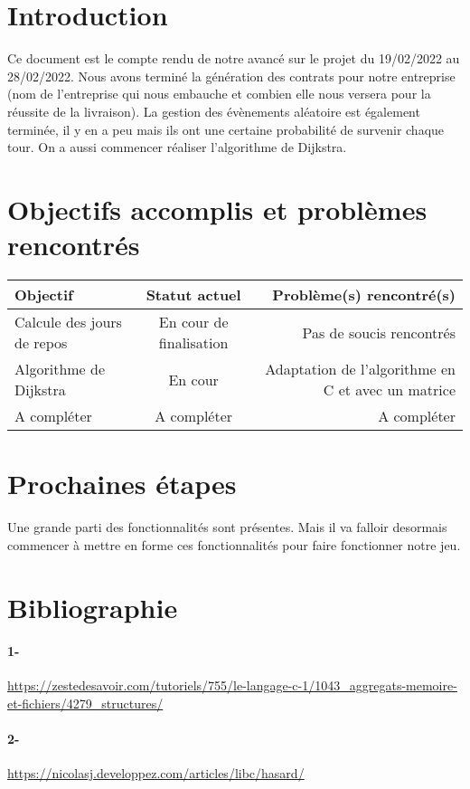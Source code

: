 \documentclass[a4paper, 12pt]{article}
\begin{document}
\newpage



\section*{Introduction}
      Ce document est le compte rendu de notre avancé sur le projet du 19/02/2022 au 28/02/2022. Nous avons terminé la génération des contrats pour notre entreprise (nom de l'entreprise qui nous embauche et combien elle nous versera pour la réussite de la livraison). La gestion des évènements aléatoire est également terminée, il y en a peu mais ils ont une certaine probabilité de survenir chaque tour. On a aussi commencer  réaliser l'algorithme de Dijkstra. 

\section{Objectifs accomplis et problèmes rencontrés}
     \begin{tabular}{|l|c|r|}
  \hline
  Objectif & Statut actuel & Problème(s) rencontré(s) \\
  \hline
  Calcule des jours de repos & En cour de finalisation & Pas de soucis rencontrés \\
  Algorithme de Dijkstra & En cour & Adaptation de l'algorithme en C et avec un matrice \\
  A compléter & A compléter & A compléter\\
  

  \hline
\end{tabular}
\section{Prochaines étapes}
    Une grande parti des fonctionnalités sont présentes. Mais il va falloir desormais commencer à mettre en forme ces fonctionnalités pour faire fonctionner notre jeu.
    

   \appendix  %
   \section{Bibliographie}
   \paragraph{1- }
    \url{https://zestedesavoir.com/tutoriels/755/le-langage-c-1/1043_aggregats-memoire-et-fichiers/4279_structures/}
    \paragraph{2- }
    \url{https://nicolasj.developpez.com/articles/libc/hasard/}
\end{document}

